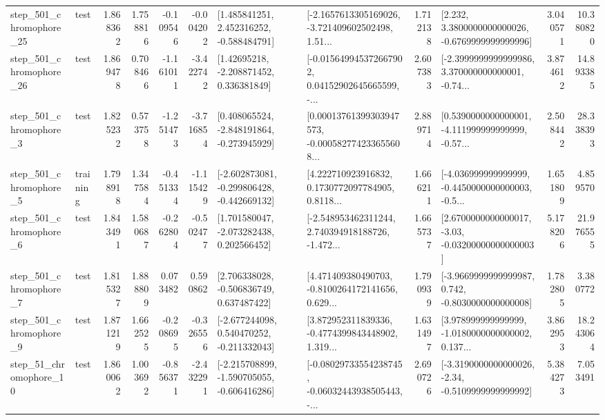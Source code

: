 \begin{tabular}{llrrrrllrlrr}
  step\_501\_chromophore\_25 &      test &      1.868362 &    1.758816 &     -0.109546 & -0.004202 &    [1.485841251, 2.452316252, -0.588484791] &  [-2.1657613305169026, -3.721409602502498, 1.51... &       1.712138 &   [2.232, 3.3800000000000026, -0.6769999999999996] &            3.040571 &         10.380820 \\
  step\_501\_chromophore\_26 &      test &      1.869478 &    0.708466 &     -1.161011 & -3.422742 &     [1.42695218, -2.208871452, 0.336381849] &  [-0.015649945372667902, 0.04152902645665599, -... &       2.607383 &  [-2.3999999999999986, 3.370000000000001, -0.74... &            3.874612 &         14.893385 \\
   step\_501\_chromophore\_3 &      test &      1.825232 &    0.573758 &     -1.251473 & -3.716854 &   [0.408065524, -2.848191864, -0.273945929] &  [0.00013761399303947573, -0.000582774233655608... &       2.889714 &  [0.5390000000000001, -4.111999999999999, -0.57... &            2.508442 &         28.338393 \\
   step\_501\_chromophore\_5 &  training &      1.798918 &    1.347584 &     -0.451334 & -1.115429 &  [-2.602873081, -0.299806428, -0.442669132] &  [4.222710923916832, 0.1730772097784905, 0.8118... &       1.666211 &  [-4.036999999999999, -0.4450000000000003, -0.5... &            1.651809 &          4.859570 \\
   step\_501\_chromophore\_6 &      test &      1.843491 &    1.580687 &     -0.262804 & -0.502477 &    [1.701580047, -2.073282438, 0.202566452] &  [-2.548953462311244, 2.740394918188726, -1.472... &       1.665737 &  [2.6700000000000017, -3.03, -0.03200000000000003] &            5.178206 &         21.976555 \\
   step\_501\_chromophore\_7 &      test &      1.815327 &    1.888809 &      0.073482 &  0.590862 &    [2.706338028, -0.506836749, 0.637487422] &  [4.471409380490703, -0.8100264172141656, 0.629... &       1.790939 &  [-3.9669999999999987, 0.742, -0.8030000000000008] &            1.782805 &          3.380772 \\
   step\_501\_chromophore\_9 &      test &      1.871219 &    1.662525 &     -0.208695 & -0.326556 &   [-2.677244098, 0.540470252, -0.211332043] &  [3.872952311839336, -0.4774399843448902, 1.319... &       1.631497 &  [3.978999999999999, -1.0180000000000002, 0.137... &            3.862953 &         18.243064 \\
   step\_51\_chromophore\_10 &      test &      1.860062 &    1.003692 &     -0.856371 & -2.432291 &  [-2.215708899, -1.590705055, -0.606416286] &  [-0.08029733554238745, -0.06032443938505443, -... &       2.690726 &  [-3.3190000000000026, -2.34, -0.5109999999999992] &            5.384273 &          7.053491 \\

\end{tabular}
